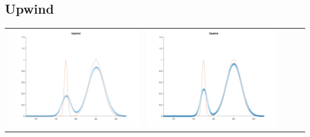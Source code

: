 \documentclass{article}
\begin{document}
\subsection{Upwind}
\begin{table}[h]
    \centering
        \begin{tabular}{ccccc}
            \includegraphics[scale = 0.17]{Upwind.png} & \includegraphics[scale = 0.17]{Upwind2.png} \\

\end{tabular}
\end{table}
\end{document}
